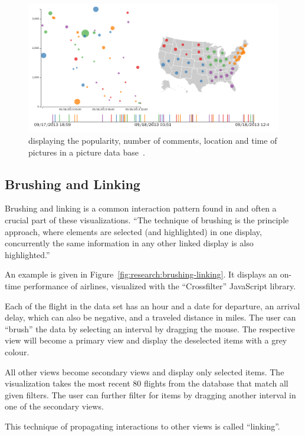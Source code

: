 \begin{figure}
  \centering
  \includegraphics[width=\textwidth]{figures/related-work/cmv}
  \caption{\cmvs{} displaying the popularity, number of comments, location and time of pictures in a picture data base~\parencite{Dukevis2017}.}
  \label{fig:related-work:cmv}
\end{figure}

\subsection{Brushing and Linking}
Brushing and linking is a common interaction pattern found in \cmvs{} and often a crucial part of these visualizations.
``The technique of brushing is the principle approach, where elements are selected (and highlighted) in one display, concurrently the same information in any other linked display is also highlighted.''~\parencite{Roberts2007}

An example is given in Figure~\ref{fig:research:brushing-linking}.
It displays an on-time performance of airlines, visualized with the ``Crossfilter'' JavaScript library.

Each of the flight in the data set has an hour and a date for departure, an arrival delay, which can also be negative, and a traveled distance in miles.
The user can ``brush'' the data by selecting an interval by dragging the mouse.
The respective view will become a primary view and display the deselected items with a grey colour.

All other views become secondary views and display only selected items.
The visualization takes the most recent 80 flights from the database that match all given filters.
The user can further filter for items by dragging another interval in one of the secondary views.

This technique of propagating interactions to other views is called ``linking''.

